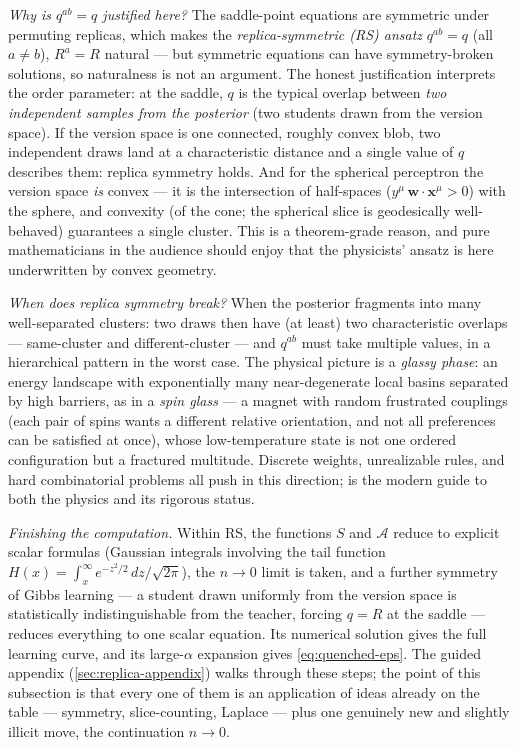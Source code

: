 \documentclass[11pt]{article}
\newcommand{\bv}[1]{\boldsymbol{#1}}
\begin{document}
\emph{Why is $q^{ab} = q$ justified here?} The saddle-point equations are
symmetric under permuting replicas, which makes the \emph{replica-symmetric
(RS) ansatz} $q^{ab} = q$ (all $a \neq b$), $R^a = R$ natural --- but
symmetric equations can have symmetry-broken solutions, so naturalness is
not an argument. The honest justification interprets the order parameter:
at the saddle, $q$ is the typical overlap between \emph{two independent
samples from the posterior} (two students drawn from the version space).
If the version space is one connected, roughly convex blob, two independent
draws land at a characteristic distance and a single value of $q$ describes
them: replica symmetry holds. And for the spherical perceptron the version
space \emph{is} convex --- it is the intersection of half-spaces
($y^\mu\,\bv{w}\cdot\bv{x}^\mu > 0$) with the sphere, and convexity (of the
cone; the spherical slice is geodesically well-behaved) guarantees a single
cluster. This is a theorem-grade reason, and pure mathematicians in the
audience should enjoy that the physicists' ansatz is here underwritten by
convex geometry.

\emph{When does replica symmetry break?} When the posterior fragments into
many well-separated clusters: two draws then have (at least) two
characteristic overlaps --- same-cluster and different-cluster --- and
$q^{ab}$ must take multiple values, in a hierarchical pattern in the worst
case. The physical picture is a \emph{glassy phase}: an energy landscape
with exponentially many near-degenerate local basins separated by high
barriers, as in a \emph{spin glass} --- a magnet with random frustrated
couplings (each pair of spins wants a different relative orientation, and
not all preferences can be satisfied at once), whose low-temperature state
is not one ordered configuration but a fractured multitude. Discrete
weights, unrealizable rules, and hard combinatorial problems all push in
this direction; \cite{zdeborova2016statistical} is the modern guide to both
the physics and its rigorous status.

\emph{Finishing the computation.} Within RS, the functions $S$ and
$\mathcal{A}$ reduce to explicit scalar formulas (Gaussian integrals
involving the tail function $H(x) = \int_x^\infty e^{-z^2/2}\,
dz/\sqrt{2\pi}$), the $n \to 0$ limit is taken, and a further symmetry of
Gibbs learning --- a student drawn uniformly from the version space is
statistically indistinguishable from the teacher, forcing $q = R$ at the
saddle --- reduces everything to one scalar equation. Its numerical solution
gives the full learning curve, and its large-$\alpha$ expansion gives
\cref{eq:quenched-eps}. The guided appendix (\cref{sec:replica-appendix})
walks through these steps; the point of this subsection is that every one
of them is an application of ideas already on the table --- symmetry,
slice-counting, Laplace --- plus one genuinely new and slightly illicit
move, the continuation $n \to 0$.
\end{document}
